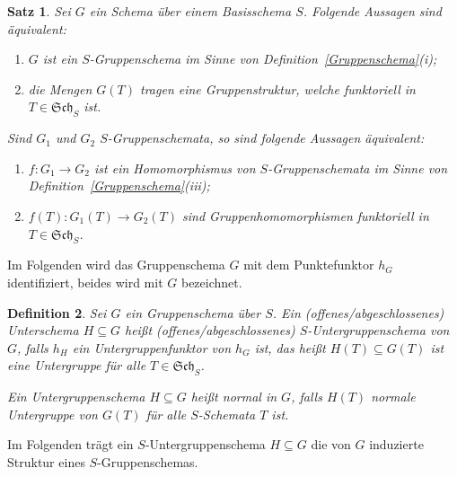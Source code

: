 \documentclass[DIV11,11pt]{scrartcl}
\theoremstyle{Definitionen}
\newtheorem{Def}{Definition}[section]
\theoremstyle{Aussagen}
\newtheorem{Satz}[Def]{Satz}
\begin{document}
\begin{Satz}
Sei $G$ ein Schema über einem Basisschema $S$. Folgende Aussagen sind äquivalent:
\begin{enumerate}
\item $G$ ist ein $S$-Gruppenschema im Sinne von Definition~\ref{Gruppenschema}(i);
\item die Mengen $G(T)$ tragen eine Gruppenstruktur, welche funktoriell in $T\in\mathfrak{Sch}_S$ ist.
\end{enumerate}
Sind $G_1$ und $G_2$ $S$-Gruppenschemata, so sind folgende Aussagen äquivalent:
\begin{enumerate}
\item $f\colon G_1\rightarrow G_2$ ist ein Homomorphismus von $S$-Gruppenschemata im Sinne von Definition~\ref{Gruppenschema}(iii);
\item $f(T)\colon G_1(T)\rightarrow G_2(T)$ sind Gruppenhomomorphismen funktoriell in $T\in\mathfrak{Sch}_S$.
\end{enumerate}
\end{Satz}

Im Folgenden wird das Gruppenschema $G$ mit dem Punktefunktor $h_G$ identifiziert, beides wird mit $G$ bezeichnet.

\begin{Def}
Sei $G$ ein Gruppenschema über $S$. Ein (offenes/abgeschlossenes) Unterschema $H\subseteq G$ heißt \textit{(offenes/abgeschlossenes) $S$-Untergruppenschema} von $G$, falls $h_H$ ein Untergruppenfunktor von $h_G$ ist, das heißt $H(T)\subseteq G(T)$ ist eine Untergruppe für alle $T\in\mathfrak{Sch}_S$. 

Ein Untergruppenschema $H\subseteq G$ heißt \textit{normal} in $G$, falls $H(T)$ normale Untergruppe von $G(T)$ für alle $S$-Schemata $T$ ist.
\end{Def}

Im Folgenden trägt ein $S$-Untergruppenschema $H\subseteq G$ die von $G$ induzierte Struktur eines $S$-Gruppenschemas.
\end{document}
